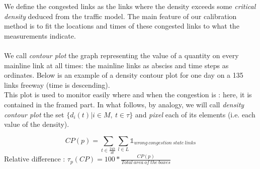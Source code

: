We define the congested links as the links where the density exceeds some \emph{critical density} deduced from the traffic model. The main feature of our calibration method is to fit the locations and times of these congested links to what the measurements indicate.\\
\\
We call \emph{contour plot} the graph representing the value of a quantity on every mainline link at all times: the mainline links as absciss and time steps as ordinates.
Below is an example of a density contour plot for one day on a 135 links freeway (time is descending).\\
This plot is used to monitor easily where and when the congestion is : here, it is contained in the framed part. In what follows, by analogy, we will call \emph{density contour plot} the set $\big\{d_{i}(t)|i\in M,\ t\in\tau\big\}$ and \emph{pixel} each of its elements (i.e. each value of the density).

			\begin{equation*}
				CP(p)=\sum_{t\in{\frac{24h}{dt}}}\sum_{l\in{L}}\mathds{1}_{wrong\ congestion\ state\ links}
			\end{equation*}
Relative difference : $\tau_{p}(CP)=100* \frac{CP(p)}{Total\ area\ of\ the\ boxes}$
